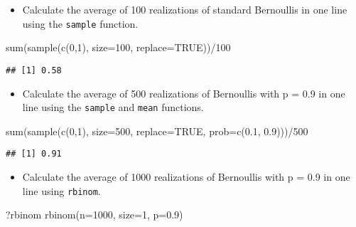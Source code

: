 \documentclass[
]{article}
\newenvironment{Shaded}{\begin{snugshade}}{\end{snugshade}}
\newcommand{\AttributeTok}[1]{\textcolor[rgb]{0.77,0.63,0.00}{#1}}
\newcommand{\ConstantTok}[1]{\textcolor[rgb]{0.00,0.00,0.00}{#1}}
\newcommand{\DecValTok}[1]{\textcolor[rgb]{0.00,0.00,0.81}{#1}}
\newcommand{\FloatTok}[1]{\textcolor[rgb]{0.00,0.00,0.81}{#1}}
\newcommand{\FunctionTok}[1]{\textcolor[rgb]{0.00,0.00,0.00}{#1}}
\newcommand{\NormalTok}[1]{#1}
\newcommand{\SpecialCharTok}[1]{\textcolor[rgb]{0.00,0.00,0.00}{#1}}
\providecommand{\tightlist}{%
  \setlength{\itemsep}{0pt}\setlength{\parskip}{0pt}}
\begin{document}
\begin{itemize}
\tightlist
\item
  Calculate the average of 100 realizations of standard Bernoullis in
  one line using the \texttt{sample} function.
\end{itemize}

\begin{Shaded}
\begin{Highlighting}[]
\FunctionTok{sum}\NormalTok{(}\FunctionTok{sample}\NormalTok{(}\FunctionTok{c}\NormalTok{(}\DecValTok{0}\NormalTok{,}\DecValTok{1}\NormalTok{), }\AttributeTok{size=}\DecValTok{100}\NormalTok{, }\AttributeTok{replace=}\ConstantTok{TRUE}\NormalTok{))}\SpecialCharTok{/}\DecValTok{100}
\end{Highlighting}
\end{Shaded}

\begin{verbatim}
## [1] 0.58
\end{verbatim}

\begin{itemize}
\tightlist
\item
  Calculate the average of 500 realizations of Bernoullis with p = 0.9
  in one line using the \texttt{sample} and \texttt{mean} functions.
\end{itemize}

\begin{Shaded}
\begin{Highlighting}[]
\FunctionTok{sum}\NormalTok{(}\FunctionTok{sample}\NormalTok{(}\FunctionTok{c}\NormalTok{(}\DecValTok{0}\NormalTok{,}\DecValTok{1}\NormalTok{), }\AttributeTok{size=}\DecValTok{500}\NormalTok{, }\AttributeTok{replace=}\ConstantTok{TRUE}\NormalTok{, }\AttributeTok{prob=}\FunctionTok{c}\NormalTok{(}\FloatTok{0.1}\NormalTok{, }\FloatTok{0.9}\NormalTok{)))}\SpecialCharTok{/}\DecValTok{500}
\end{Highlighting}
\end{Shaded}

\begin{verbatim}
## [1] 0.91
\end{verbatim}

\begin{itemize}
\tightlist
\item
  Calculate the average of 1000 realizations of Bernoullis with p = 0.9
  in one line using \texttt{rbinom}.
\end{itemize}

\begin{Shaded}
\begin{Highlighting}[]
\NormalTok{?rbinom}
\FunctionTok{rbinom}\NormalTok{(}\AttributeTok{n=}\DecValTok{1000}\NormalTok{, }\AttributeTok{size=}\DecValTok{1}\NormalTok{, }\AttributeTok{p=}\FloatTok{0.9}\NormalTok{)}
\end{Highlighting}
\end{Shaded}
\end{document}

